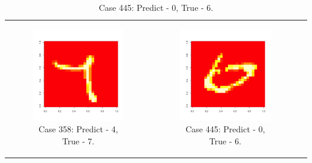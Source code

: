 \documentclass[10pt]{extarticle}
\begin{document}
\begin{table}[H]
\begin{tabular}{c c c}
\begin{subfigure}{0.3\textwidth}\centering\includegraphics[scale = .25]{../Images/358.png}\caption{Case 358: Predict - 4, True - 7.}\label{fig:taba}\end{subfigure}&
\begin{subfigure}{0.3\textwidth}\centering\includegraphics[scale = .25]{../Images/445.png}\caption{Case 445: Predict - 0, True - 6.}\label{fig:taba}\end{subfigure}&

\end{tabular}
\end{table}
\end{document}
